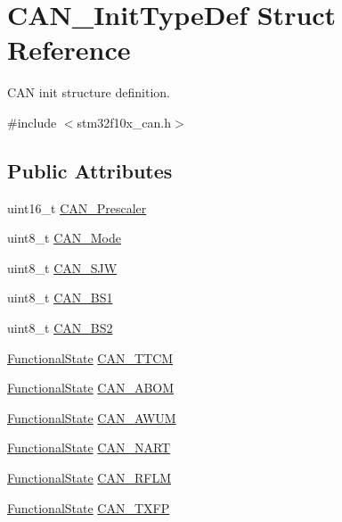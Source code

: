 \hypertarget{struct_c_a_n___init_type_def}{}\section{C\+A\+N\+\_\+\+Init\+Type\+Def Struct Reference}
\label{struct_c_a_n___init_type_def}


C\+AN init structure definition.  




{\ttfamily \#include $<$stm32f10x\+\_\+can.\+h$>$}

\subsection*{Public Attributes}
\begin{DoxyCompactItemize}
\item 
uint16\+\_\+t \hyperlink{struct_c_a_n___init_type_def_a3e91dbcbf30b893a9bd6a65606cb8fe9}{C\+A\+N\+\_\+\+Prescaler}
\item 
uint8\+\_\+t \hyperlink{struct_c_a_n___init_type_def_a24816ff18ae048a5ec4bbb22aa2c04f9}{C\+A\+N\+\_\+\+Mode}
\item 
uint8\+\_\+t \hyperlink{struct_c_a_n___init_type_def_addac271c43490cb37ac7293f7bf201c2}{C\+A\+N\+\_\+\+S\+JW}
\item 
uint8\+\_\+t \hyperlink{struct_c_a_n___init_type_def_aecbd21b55dc88c3a18db93af2836cd58}{C\+A\+N\+\_\+\+B\+S1}
\item 
uint8\+\_\+t \hyperlink{struct_c_a_n___init_type_def_a693eb00830d6e2aeb4d9fabdba85b9cf}{C\+A\+N\+\_\+\+B\+S2}
\item 
\hyperlink{group___exported__types_gac9a7e9a35d2513ec15c3b537aaa4fba1}{Functional\+State} \hyperlink{struct_c_a_n___init_type_def_aa53ceafdcf1a9a5c9a6566006c9a4b60}{C\+A\+N\+\_\+\+T\+T\+CM}
\item 
\hyperlink{group___exported__types_gac9a7e9a35d2513ec15c3b537aaa4fba1}{Functional\+State} \hyperlink{struct_c_a_n___init_type_def_a70560646c27d96ca8adc4a62d24dafd9}{C\+A\+N\+\_\+\+A\+B\+OM}
\item 
\hyperlink{group___exported__types_gac9a7e9a35d2513ec15c3b537aaa4fba1}{Functional\+State} \hyperlink{struct_c_a_n___init_type_def_a10f873c858a7b0efc2d0ab41524320d3}{C\+A\+N\+\_\+\+A\+W\+UM}
\item 
\hyperlink{group___exported__types_gac9a7e9a35d2513ec15c3b537aaa4fba1}{Functional\+State} \hyperlink{struct_c_a_n___init_type_def_a5adeac1b7b47f2b91e667eddc181ac09}{C\+A\+N\+\_\+\+N\+A\+RT}
\item 
\hyperlink{group___exported__types_gac9a7e9a35d2513ec15c3b537aaa4fba1}{Functional\+State} \hyperlink{struct_c_a_n___init_type_def_aa63787683c0ad533b513fb60355d76f1}{C\+A\+N\+\_\+\+R\+F\+LM}
\item 
\hyperlink{group___exported__types_gac9a7e9a35d2513ec15c3b537aaa4fba1}{Functional\+State} \hyperlink{struct_c_a_n___init_type_def_a003de4b70fc93b4f820f320c6ea75a16}{C\+A\+N\+\_\+\+T\+X\+FP}
\end{DoxyCompactItemize}


